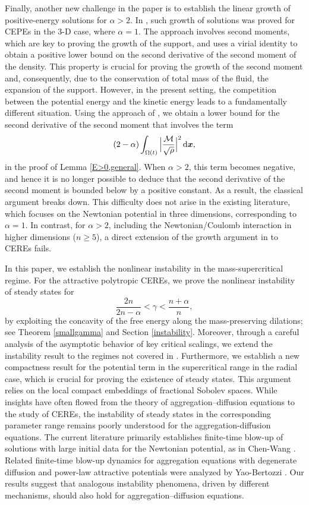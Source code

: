 \documentclass[reqno,11pt]{amsart}
\numberwithin{equation}{section}
\theoremstyle{definition}
\def\dd{{\, \rm d}}
\begin{document}
\smallskip
Finally, another new challenge in the paper is to establish the linear growth of 
positive-energy solutions 
for $\alpha > 2$. In \cite{Deng_2002}, 
such growth of solutions was proved for CEPEs in the 3-D case, 
where $\alpha = 1$.
The approach involves second moments, which are key to proving the growth of the support, 
and uses a virial identity to obtain a positive lower bound on the second derivative 
of the second moment of the density. 
This property is crucial for proving the growth of the second moment and, consequently, 
due to the conservation of total mass of the fluid, the expansion of the support. 
However, in the present setting, the competition between the potential energy 
and the kinetic energy leads to a fundamentally different situation. 
Using the approach of \cite{Deng_2002}, 
we obtain a lower bound for the second derivative of the second moment that involves the term
\[
    (2-\alpha)\int_{\Omega(t)}\Big| \frac{\mathcal{M}}{\sqrt{\rho}} \Big|^2\dd \boldsymbol{x},
\] 
in the proof of Lemma \ref{E>0,general}. 
When $\alpha>2$, this term becomes negative, and hence it is no longer possible to deduce that 
the second derivative of the second moment is bounded below by a positive constant. 
As a result, the classical argument breaks down.
This difficulty does not arise in the existing literature, which focuses on the Newtonian potential 
in three dimensions, corresponding to $\alpha=1$. In contrast, for $\alpha>2$, including 
the Newtonian/Coulomb interaction in higher dimensions ($n\ge 5$), a direct extension 
of the growth argument in \cite{Deng_2002} to CEREs fails.

\smallskip
In this paper, we establish the nonlinear instability in the mass-supercritical regime.
For the attractive polytropic CEREs, we prove the nonlinear instability of steady states for
$$
\frac{2n}{2n-\alpha}<\gamma<\frac{n+\alpha}{n},
$$
by exploiting the concavity of the free energy along the mass-preserving dilations; 
see Theorem \ref{smallgamma} and Section \ref{instability}. 
Moreover, through a careful analysis of the asymptotic behavior of key critical scalings,
we extend the instability result to the regimes not covered in \cite{Cheng_2025}. 
Furthermore, we establish a new compactness result for the potential term 
in the supercritical range in the radial case, which is crucial for proving 
the existence of steady states. This argument relies on the local compact 
embeddings of fractional Sobolev spaces. 
While insights have often flowed from the theory of aggregation–diffusion equations 
to the study of CEREs, the instability of steady states in the corresponding parameter range remains poorly
understood for the aggregation-diffusion equations.
The current literature primarily establishes 
finite-time blow-up of solutions with large initial data for the Newtonian potential, 
as in Chen-Wang \cite{Chen_2014}. Related finite-time blow-up dynamics for aggregation equations with degenerate
diffusion and power-law attractive potentials were analyzed by Yao-Bertozzi
\cite{YaoBertozzi2013}. Our results suggest that analogous instability phenomena, driven by different mechanisms, 
should also hold for aggregation–diffusion equations.
\end{document}
